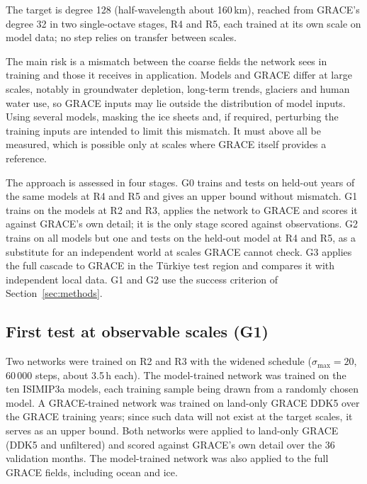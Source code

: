 \documentclass[11pt,a4paper]{article}
\begin{document}
The target is degree 128 (half-wavelength about 160\,km), reached from GRACE's degree 32 in two
single-octave stages, R4 and R5, each trained at its own scale on model data; no step relies on
transfer between scales.

The main risk is a mismatch between the coarse fields the network sees in training and those it
receives in application. Models and GRACE differ at large scales, notably in groundwater
depletion, long-term trends, glaciers and human water use, so GRACE inputs may lie outside the
distribution of model inputs. Using several models, masking the ice sheets and, if required,
perturbing the training inputs are intended to limit this mismatch. It must above all be
measured, which is possible only at scales where GRACE itself provides a reference.

The approach is assessed in four stages. G0 trains and tests on held-out years of the same models
at R4 and R5 and gives an upper bound without mismatch. G1 trains on the models at R2 and R3,
applies the network to GRACE and scores it against GRACE's own detail; it is the only stage
scored against observations. G2 trains on all models but one and tests on the held-out model at
R4 and R5, as a substitute for an independent world at scales GRACE cannot check. G3 applies the
full cascade to GRACE in the Türkiye test region and compares it with independent local data. G1
and G2 use the success criterion of Section~\ref{sec:methods}.

\subsection{First test at observable scales (G1)}
Two networks were trained on R2 and R3 with the widened schedule ($\sigma_\mathrm{max} = 20$,
60\,000 steps, about 3.5\,h each). The model-trained network was trained on the ten ISIMIP3a
models, each training sample being drawn from a randomly chosen model. A GRACE-trained network
was trained on land-only GRACE DDK5 over the GRACE training years; since such data will not exist
at the target scales, it serves as an upper bound. Both networks were applied to land-only GRACE
(DDK5 and unfiltered) and scored against GRACE's own detail over the 36 validation months. The
model-trained network was also applied to the full GRACE fields, including ocean and ice.
\end{document}
